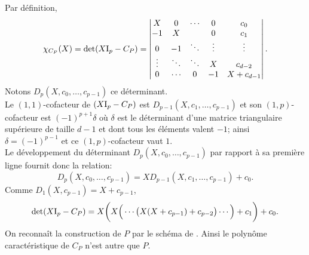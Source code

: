 
\begin{demo}
    Par définition,
    \[
    \chi_{C_P}(X) = \det(X \mathrm{I}_p - C_P) = 
    \begin{vmatrix}
        X & 0 & \cdots & 0 & c_0 \\
        -1 & X & & 0 & c_1 \\
        0 & -1 & \ddots & \vdots & \vdots \\
        \vdots & \ddots & \ddots & X & c_{d-2} \\
        0 & \cdots & 0 & -1 & X + c_{d-1}
    \end{vmatrix}.
    \]
    Notons $D_p(X, c_0, \dots, c_{p-1})$ ce déterminant. \\
    Le $(1,1)$-cofacteur de $(X \mathrm{I}_p - C_P)$ est $D_{p-1}(X, c_1, \dots, c_{p-1})$ et son $(1,p)$-cofacteur est $(-1)^{p+1} \delta$ où $\delta$ est le déterminant d'une matrice triangulaire supérieure de taille $d-1$ et dont tous les éléments valent $-1$; ainsi $\delta = (-1)^{p-1}$ et ce $(1,p)$-cofacteur vaut $1$. \\
    Le développement du déterminant $D_p(X, c_0, \dots, c_{p-1})$ par rapport à sa première ligne fournit donc la relation:
    $$D_p(X, c_0, \dots, c_{p-1}) = X D_{p-1}(X, c_1, \dots, c_{p-1}) + c_0.$$
    Comme $D_1(X, c_{p-1}) = X + c_{p-1}$,
    $$\det(X \mathrm{I}_p - C_P) = X \bigg(X \Big(\cdots \big(X(X+c_{p-1}) + c_{p-2} \big) \cdots \Big) + c_1 \bigg) + c_0.$$
    On reconnaît la construction de $P$ par le schéma de . Ainsi le polynôme caractéristique de $C_P$ n'est autre que $P$. 
\end{demo} 

